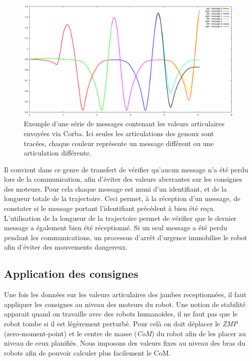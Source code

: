 \begin{figure}[h]
\begin{center}
\includegraphics[width=15.0cm]{images/messages.png}
\caption{Exemple d'une série de messages contenant les valeurs articulaires envoyées via Corba. Ici seules les articulations des genoux sont tracées, chaque couleur représente un message différent ou une articulation différente.}
\label{fig:message}
\end{center}
\end{figure}

Il convient dans ce genre de transfert de vérifier qu'aucun message n'a été perdu lors de la communication, afin d'éviter des valeurs aberrantes sur les consignes des moteurs. Pour cela chaque message est muni d'un identifiant, et de la longueur totale de la trajectoire. Ceci permet, à la réception d'un message, de constater si le message portant l'identifiant précédent à bien été reçu. L'utilisation de la longueur de la trajectoire permet de vérifier que le dernier message a également bien été réceptionné. Si un seul message a été perdu pendant les communications, un processus d'arrêt d'urgence immobilise le robot afin d'éviter des mouvements dangereux.


\subsection{Application des consignes}
\label{sub:sot}

Une fois les données sur les valeurs articulaires des jambes receptionnées, il faut appliquer les consignes au niveau des moteurs du robot.
Une notion de stabilité apparait quand on travaille avec  des robots humanoïdes, il ne faut pas que le robot tombe si il est légèrement perturbé. Pour celà on doit déplacer le \emph{ZMP}~\cite{Kajita03bipedwalking} (zero-moment-point) et le centre de masse (\emph{CoM}) du robot afin de les placer au niveau de ceux planifiés.
Nous imposons des valeurs fixes au niveau des bras du robots afin de pouvoir calculer plus facilement le CoM.

